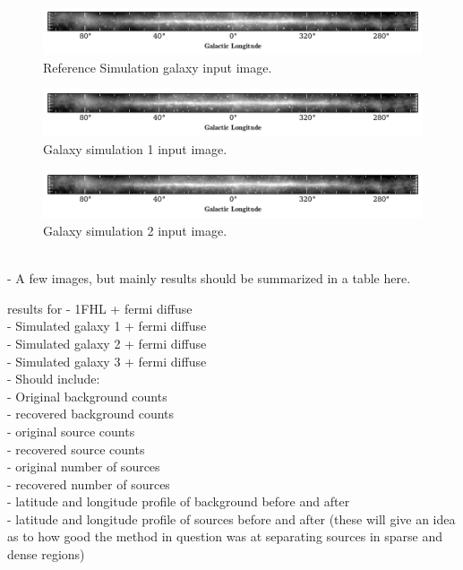 \documentclass{PoS}
\begin{document}
\begin{figure}
  \begin{center}
      \includegraphics[width=\textwidth]{figures/SIM1.pdf}
  \caption{Reference Simulation galaxy input image.}
  \end{center}
\end{figure}

\begin{figure}
  \begin{center}
      \includegraphics[width=\textwidth]{figures/SIM2.pdf}
  \caption{Galaxy simulation 1 input image.}
  \end{center}
\end{figure}

\begin{figure}
  \begin{center}
      \includegraphics[width=\textwidth]{figures/SIM3.pdf}
  \caption{Galaxy simulation 2 input image.}
  \end{center}
\end{figure}
\\
- A few images, but mainly results should be summarized in a table here.



results for
- 1FHL + fermi diffuse\\
- Simulated galaxy 1 + fermi diffuse\\
- Simulated galaxy 2 + fermi diffuse\\
- Simulated galaxy 3 + fermi diffuse\\

- Should include:\\
    - Original background counts\\
    - recovered background counts\\
    - original source counts\\
    - recovered source counts\\
    - original number of sources\\
    - recovered number of sources\\
    - latitude and longitude profile of background before and after\\
    - latitude and longitude profile of sources before and after
        (these will give an idea as to how good the method in question was at separating sources in sparse and dense regions)
\end{document}
